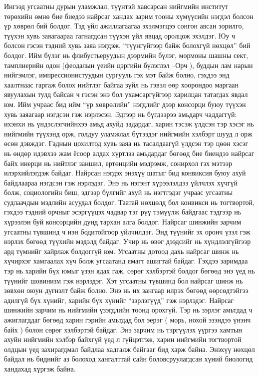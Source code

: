 Ингээд угсаатны дурын уламжлал, түүнтэй хавсарсан нийгмийн институт төрөхийн өмнө бие биедээ найрсаг хандах зарим тооны хүмүүсийн нэгдэл болсон үр хөврөл бий болдог. Тэд үйл ажиллагаагаа эхэлмэгцээ сонгон авсан зорилго, түүхэн хувь заяагаараа гагнагдсан түүхэн үйл явцад оролцож эхэлдэг. Юу ч болсон гэсэн тэдний хувь заяа нэгдэж, “түүнгүйгээр байж болохгүй нөхцөл” бий болдог. Ийм бүлэг нь флибустьеруудын дээрмийн бүлэг, мормоны шашны сект, тамплиерийн одон (феодалын үеийн цэргийн бүлэглэл –Орч ), буддын лам нарын нийгэмлэг, импрессионистуудын сургууль гэх мэт байж болно, гэхдээ энд хаалтнаас гаргаж болох нийтлэг байгаа зүйл нь гэвэл өөр хоорондоо маргаан явуулахын тулд байсан ч гэсэн энэ бол ухамсаргүйгээр харилцан татагдах явдал юм. Ийм учраас бид ийм “үр хөврөлийн” нэгдлийг дээр консорци буюу түүхэн хувь заяагаар нэгдсэн гэж нэрлэсэн. Эдгээр нь бүгдээрээ амьдарч чаддаггүй: ихэнхи нь үндэслэгчийнхээ амьд ахуйд задардаг, харин тэсэж үлдсэн тэр хэсэг нь нийгмийн түүхэнд орж, голдуу уламжлал бүтээдэг нийгмийн хэлбэрт шууд л орж өсөн дэвждэг. Гаднын цохилтод хувь заяа нь тасалдаагүй үлдсэн тэр цөөн хэсэг нь өндөр идэвхээ жам ёсоор алдах хүртлээ амьдардаг бөгөөд бие биендээ найрсаг байх инерци нь нийтлэг заншил, ертөнцийн мэдрэмж, сонирхол гэх мэтээр илэрхийлэгдэж байдаг. Найрсан нэгдэх энэхүү шатыг бид конвиксия буюу ахуй байдлаараа нэгдсэн гэж нэрлэдэг. Энэ нь нэгэнт хүрээлэлдээ үйлчлэх хүчгүй болж, социологийн биш, эдгээр бүлгийг ахуй нь нэгтгэдэг учраас угсаатны судлаачдын мэдлийн асуудал болдог. Таатай нөхцөлд бол конвикси нь тогтвортой, гэхдээ тэдний орчныг эсэргүүцэх чадвар тэг рүү тэмүүлж байдгаас тэдгээр нь хүрээлэн буй консорцийн дунд тархан алга болдог.
Найрсаг шинжийн зарчим угсаатны түвшинд ч нэн бодитойгоор үйлчилдэг. Энд түүнийг эх оронч үзэл гэж нэрлэх бөгөөд түүхийн мэдэлд байдаг. Учир нь өвөг дээдсийг нь хүндлэлгүйгээр ард түмнийг хайрлаж болдоггүй юм. Угсаатны дотоод дахь найрсаг шинж нь хүчирхэг хамгаалах хүч болж угсаатанд ямагт ашигтай байдаг. Гэхдээ заримдаа тэр нь харийн бүх юмыг үзэн ядах гаж, сөрөг хэлбэртэй болдог бөгөөд энэ үед нь түүнийг шовинизм гэж нэрлэдэг.
Хэт угсаатны түвшинд бол найрсаг шинж нь зөвхөн оюун дүгнэлт байж болно. Энэ нь их зангаар илрэх бөгөөд өөрсөдтэйгээ адилгүй бүх хүнийг, харийн бүх хүнийг “зэрлэгүүд” гэж нэрлэдэг.
Найрсаг шинжийн зарчим нь нийгмийн үзэгдлийн тоонд орохгүй. Тэр нь зэрлэг амьтдад ч ажиглагддаг бөгөөд харин гэрийн амьтдад бол эерэг ( морь, нохой эзэндээ үнэнч байх ) болон сөрөг хэлбэртэй байдаг.
Энэ зарчим нь тэргүүлэх үүргээ хамтын ахуйн нийгмийн хэлбэр байхгүй үед л гүйцэтгэж, харин нийгмийн тогтвортой олдцын үед захирагдмал байдлаа хадгалж байгааг бид харж байна. Энэхүү нөхцөл байдал нь биднийг аз болоход хангалттай сайн боловсруулагдсан хүний биологид хандахад хүргэж байна.
